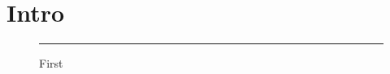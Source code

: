 \documentclass{article}
\begin{document}
\section{Intro}
\lipsum[1-12]
\begin{figure}[t]\centering\rule{4cm}{3cm}\caption{First}\label{fig:a}\end{figure}
\lipsum[13-20]
\end{document}
